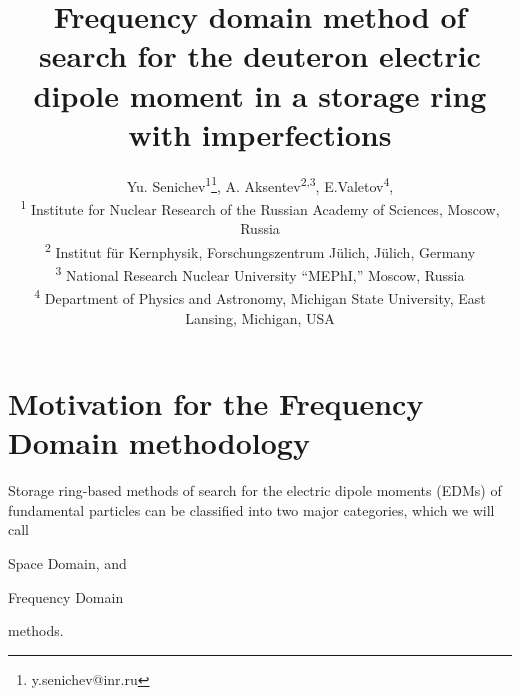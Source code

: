 \documentclass[a4paper]{jacow}
\begin{document}
\title{Frequency domain method of search for the deuteron electric dipole moment
  in a storage ring with imperfections}

\author{Yu. Senichev\textsuperscript{1}\thanks{y.senichev@inr.ru},
  A. Aksentev\textsuperscript{2,}\textsuperscript{3},
  E.Valetov\textsuperscript{4}, \\
  \textsuperscript{1} Institute for Nuclear Research of the Russian Academy of Sciences, Moscow, Russia\\
  \textsuperscript{2} Institut f\"ur Kernphysik, Forschungszentrum J\"ulich, J\"ulich, Germany\\
  \textsuperscript{3} National Research Nuclear University ``MEPhI,'' Moscow, Russia\\
  \textsuperscript{4} Department of Physics and Astronomy, Michigan State University, East Lansing, Michigan, USA}


\maketitle

\section{Motivation for the Frequency Domain methodology}

Storage ring-based methods of search for the electric dipole moments (EDMs) of fundamental particles
can be classified into two major categories, which we will call
\begin{inparaenum}
\item Space Domain, and
\item Frequency Domain
\end{inparaenum}
methods.
\end{document}
